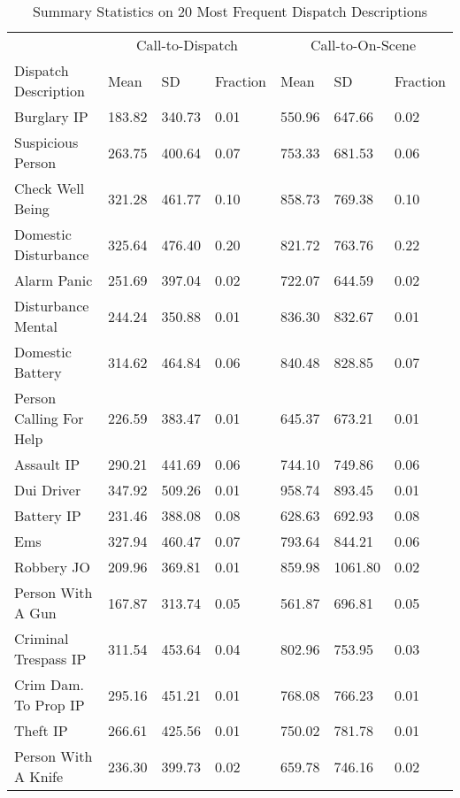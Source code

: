 \begin{table}
\centering
\caption{\label{summy_stats_descriptions}Summary Statistics on 20 Most Frequent Dispatch Descriptions}
\centering
\begin{threeparttable}
\begin{tabular}[t]{lllllll}
\toprule
\multicolumn{1}{c}{ } & \multicolumn{3}{c}{Call-to-Dispatch} & \multicolumn{3}{c}{Call-to-On-Scene} \\
\cmidrule(l{3pt}r{3pt}){2-4} \cmidrule(l{3pt}r{3pt}){5-7}
Dispatch Description & Mean & SD & Fraction & Mean & SD & Fraction\\
\midrule
Burglary IP & 183.82 & 340.73 & 0.01 & 550.96 & 647.66 & 0.02\\
Suspicious Person & 263.75 & 400.64 & 0.07 & 753.33 & 681.53 & 0.06\\
Check Well Being & 321.28 & 461.77 & 0.10 & 858.73 & 769.38 & 0.10\\
Domestic Disturbance & 325.64 & 476.40 & 0.20 & 821.72 & 763.76 & 0.22\\
Alarm Panic & 251.69 & 397.04 & 0.02 & 722.07 & 644.59 & 0.02\\
\addlinespace
Disturbance Mental & 244.24 & 350.88 & 0.01 & 836.30 & 832.67 & 0.01\\
Domestic Battery & 314.62 & 464.84 & 0.06 & 840.48 & 828.85 & 0.07\\
Person Calling For Help & 226.59 & 383.47 & 0.01 & 645.37 & 673.21 & 0.01\\
Assault IP & 290.21 & 441.69 & 0.06 & 744.10 & 749.86 & 0.06\\
Dui Driver & 347.92 & 509.26 & 0.01 & 958.74 & 893.45 & 0.01\\
\addlinespace
Battery IP & 231.46 & 388.08 & 0.08 & 628.63 & 692.93 & 0.08\\
Ems & 327.94 & 460.47 & 0.07 & 793.64 & 844.21 & 0.06\\
Robbery JO & 209.96 & 369.81 & 0.01 & 859.98 & 1061.80 & 0.02\\
Person With A Gun & 167.87 & 313.74 & 0.05 & 561.87 & 696.81 & 0.05\\
Criminal Trespass IP & 311.54 & 453.64 & 0.04 & 802.96 & 753.95 & 0.03\\
\addlinespace
Crim Dam. To Prop IP & 295.16 & 451.21 & 0.01 & 768.08 & 766.23 & 0.01\\
Theft IP & 266.61 & 425.56 & 0.01 & 750.02 & 781.78 & 0.01\\
Person With A Knife & 236.30 & 399.73 & 0.02 & 659.78 & 746.16 & 0.02\\

\end{tabular}
\end{threeparttable}
\end{table}
